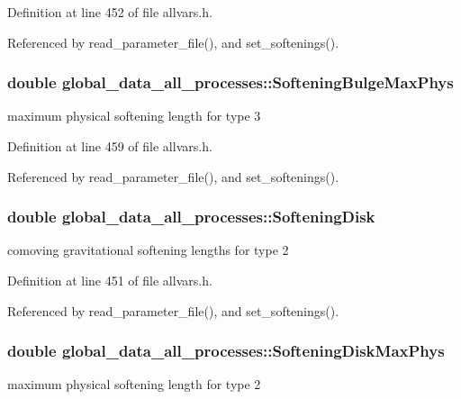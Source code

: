 Definition at line 452 of file allvars.h.



Referenced by read\_\-parameter\_\-file(), and set\_\-softenings().

\hypertarget{structglobal__data__all__processes_a215c28ea2e54629e8537bd9868401fa7}{
\subsubsection[{SofteningBulgeMaxPhys}]{\setlength{\rightskip}{0pt plus 5cm}double {\bf global\_\-data\_\-all\_\-processes::SofteningBulgeMaxPhys}}}
\label{structglobal__data__all__processes_a215c28ea2e54629e8537bd9868401fa7}
maximum physical softening length for type 3 

Definition at line 459 of file allvars.h.



Referenced by read\_\-parameter\_\-file(), and set\_\-softenings().

\hypertarget{structglobal__data__all__processes_a4a4453f9f76bb91ff3418d864caf3222}{
\subsubsection[{SofteningDisk}]{\setlength{\rightskip}{0pt plus 5cm}double {\bf global\_\-data\_\-all\_\-processes::SofteningDisk}}}
\label{structglobal__data__all__processes_a4a4453f9f76bb91ff3418d864caf3222}
comoving gravitational softening lengths for type 2 

Definition at line 451 of file allvars.h.



Referenced by read\_\-parameter\_\-file(), and set\_\-softenings().

\hypertarget{structglobal__data__all__processes_a575a685feed5223ffc7c5b42b2b369b9}{
\subsubsection[{SofteningDiskMaxPhys}]{\setlength{\rightskip}{0pt plus 5cm}double {\bf global\_\-data\_\-all\_\-processes::SofteningDiskMaxPhys}}}
\label{structglobal__data__all__processes_a575a685feed5223ffc7c5b42b2b369b9}
maximum physical softening length for type 2 

